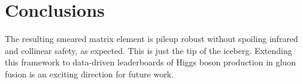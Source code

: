\section{Conclusions}\label{sec:conclusions}

The resulting smeared matrix element is pileup robust without spoiling
infrared and collinear safety, as expected. This is just the tip of the
iceberg. Extending this framework to data-driven leaderboards of Higgs
boson production in gluon fusion is an exciting direction for future
work.

